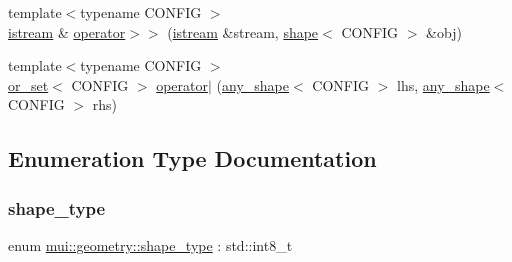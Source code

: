 \begin{DoxyCompactItemize}
\item 
{\footnotesize template$<$typename C\+O\+N\+F\+IG $>$ }\\\hyperlink{classmui_1_1istream}{istream} \& \hyperlink{namespacemui_1_1geometry_a634dc6cb5fb8052448ee1079111ddc50}{operator$>$$>$} (\hyperlink{classmui_1_1istream}{istream} \&stream, \hyperlink{classmui_1_1geometry_1_1shape}{shape}$<$ C\+O\+N\+F\+IG $>$ \&obj)
\item 
{\footnotesize template$<$typename C\+O\+N\+F\+IG $>$ }\\\hyperlink{classmui_1_1geometry_1_1or__set}{or\+\_\+set}$<$ C\+O\+N\+F\+IG $>$ \hyperlink{namespacemui_1_1geometry_aa280a571c409841cd8e7ecb1774fd266}{operator$\vert$} (\hyperlink{classmui_1_1geometry_1_1any__shape}{any\+\_\+shape}$<$ C\+O\+N\+F\+IG $>$ lhs, \hyperlink{classmui_1_1geometry_1_1any__shape}{any\+\_\+shape}$<$ C\+O\+N\+F\+IG $>$ rhs)
\end{DoxyCompactItemize}


\subsection{Enumeration Type Documentation}
\mbox{\label{namespacemui_1_1geometry_a5f311a343181e2f20482e5c9afb0f136}} 
\subsubsection{\texorpdfstring{shape\+\_\+type}{shape\_type}}
{\footnotesize\ttfamily enum \hyperlink{namespacemui_1_1geometry_a5f311a343181e2f20482e5c9afb0f136}{mui\+::geometry\+::shape\+\_\+type} \+: std\+::int8\+\_\+t\hspace{0.3cm}{\ttfamily [strong]}}

